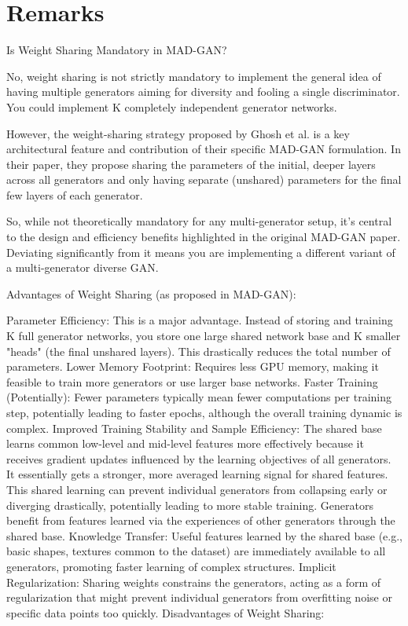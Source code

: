 \section{Remarks}

Is Weight Sharing Mandatory in MAD-GAN?

No, weight sharing is not strictly mandatory to implement the general idea of having multiple generators aiming for diversity and fooling a single discriminator. You could implement K completely independent generator networks.

However, the weight-sharing strategy proposed by Ghosh et al. is a key architectural feature and contribution of their specific MAD-GAN formulation. In their paper, they propose sharing the parameters of the initial, deeper layers across all generators and only having separate (unshared) parameters for the final few layers of each generator.

So, while not theoretically mandatory for any multi-generator setup, it's central to the design and efficiency benefits highlighted in the original MAD-GAN paper. Deviating significantly from it means you are implementing a different variant of a multi-generator diverse GAN.

Advantages of Weight Sharing (as proposed in MAD-GAN):

Parameter Efficiency: This is a major advantage. Instead of storing and training K full generator networks, you store one large shared network base and K smaller "heads" (the final unshared layers). This drastically reduces the total number of parameters.
Lower Memory Footprint: Requires less GPU memory, making it feasible to train more generators or use larger base networks.
Faster Training (Potentially): Fewer parameters typically mean fewer computations per training step, potentially leading to faster epochs, although the overall training dynamic is complex.
Improved Training Stability and Sample Efficiency:
The shared base learns common low-level and mid-level features more effectively because it receives gradient updates influenced by the learning objectives of all generators. It essentially gets a stronger, more averaged learning signal for shared features.
This shared learning can prevent individual generators from collapsing early or diverging drastically, potentially leading to more stable training.
Generators benefit from features learned via the experiences of other generators through the shared base.
Knowledge Transfer: Useful features learned by the shared base (e.g., basic shapes, textures common to the dataset) are immediately available to all generators, promoting faster learning of complex structures.
Implicit Regularization: Sharing weights constrains the generators, acting as a form of regularization that might prevent individual generators from overfitting noise or specific data points too quickly.
Disadvantages of Weight Sharing:

